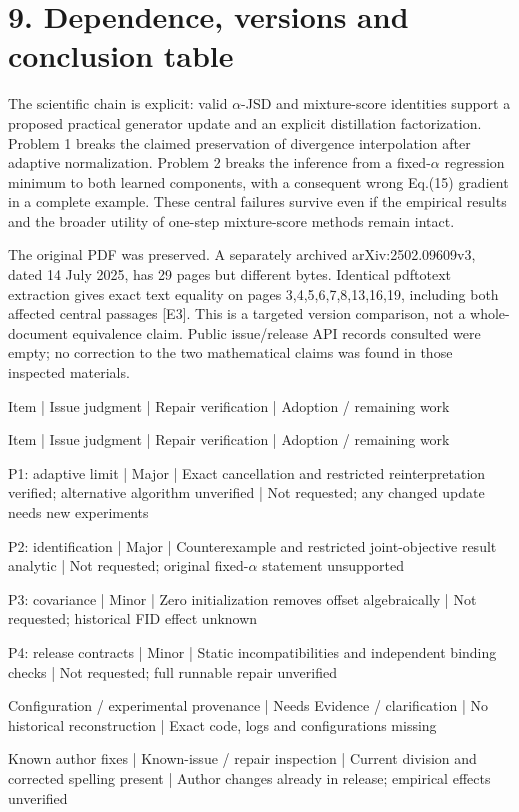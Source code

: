 \documentclass[10pt]{article}
\begin{document}
\section*{9. Dependence, versions and conclusion table}
The scientific chain is explicit: valid \(\alpha\)-JSD and mixture-score identities support a proposed practical generator update and an explicit distillation factorization. Problem 1 breaks the claimed preservation of divergence interpolation after adaptive normalization. Problem 2 breaks the inference from a fixed-\(\alpha\) regression minimum to both learned components, with a consequent wrong Eq.(15) gradient in a complete example. These central failures survive even if the empirical results and the broader utility of one-step mixture-score methods remain intact.\par
The original PDF was preserved. A separately archived arXiv:2502.09609v3, dated 14 July 2025, has 29 pages but different bytes. Identical pdftotext extraction gives exact text equality on pages 3,4,5,6,7,8,13,16,19, including both affected central passages [E3]. This is a targeted version comparison, not a whole-document equivalence claim. Public issue/release API records consulted were empty; no correction to the two mathematical claims was found in those inspected materials.\par
Item | Issue judgment | Repair verification | Adoption / remaining work\par
Item | Issue judgment | Repair verification | Adoption / remaining work\par
P1: adaptive limit | Major | Exact cancellation and restricted reinterpretation verified; alternative algorithm unverified | Not requested; any changed update needs new experiments\par
P2: identification | Major | Counterexample and restricted joint-objective result analytic | Not requested; original fixed-\(\alpha\) statement unsupported\par
P3: covariance | Minor | Zero initialization removes offset algebraically | Not requested; historical FID effect unknown\par
P4: release contracts | Minor | Static incompatibilities and independent binding checks | Not requested; full runnable repair unverified\par
Configuration / experimental provenance | Needs Evidence / clarification | No historical reconstruction | Exact code, logs and configurations missing\par
Known author fixes | Known-issue / repair inspection | Current division and corrected spelling present | Author changes already in release; empirical effects unverified\par
\end{document}
